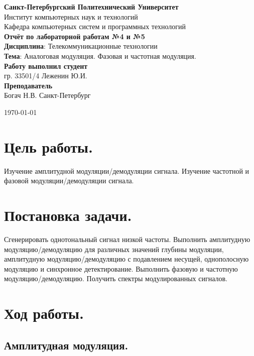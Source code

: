 \documentclass[a4paper,14pt]{extarticle}
\begin{document}
\begin{titlepage}
\centering 
{\bfseries Санкт-Петербургский Политехнический Университет} \\
Институт компьютерных наук и технологий \\
Кафедра компьютерных систем и программных технологий \\
\vspace{5cm}
{\centering \textbf{Отчёт по лабораторной работам №4 и №5} \\ 
\vspace{0.15cm}
\textbf{Дисциплина}: Телекоммуникационные технологии \\
\vspace{0.15cm}
\textbf{Тема}: Аналоговая модуляция. Фазовая и частотная модуляция.} \\
\vspace{4cm}
\hfill {\bfseries Работу выполнил студент}  \\
\hfill гр. 33501/4 Леженин Ю.И. \\
\hfill {\bfseries Преподаватель}  \\
\hfill Богач Н.В.
\vfill
Санкт-Петербург \\
{\large \today\par}
\end{titlepage}

\section{Цель работы.}

Изучение амплитудной модуляции/демодуляции сигнала. Изучение частотной и фазовой модуляции/демодуляции сигнала.

\section{Постановка задачи.} 

Сгенерировать однотональный сигнал низкой частоты. Выполнить амплитудную модуляцию/демодуляцию для различных значений глубины модуляции, амплитудную модуляцию/демодуляцию с подавлением несущей, однополосную модуляцию и синхронное детектирование. Выполнить фазовую и частотную модуляцию/демодуляцию. Получить спектры модулированных сигналов.


\section{Ход работы.}

\subsection{Амплитудная модуляция.}
\end{document}
